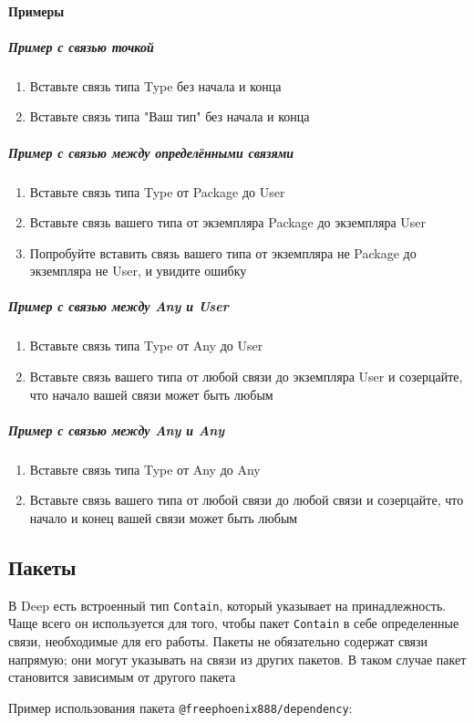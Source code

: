 \documentclass{article}
\begin{document}
\paragraph{Примеры}
\subparagraph{Пример с связью точкой}
\begin{enumerate}
  \item Вставьте связь типа Type без начала и конца
  \item Вставьте связь типа "Ваш тип" без начала и конца
\end{enumerate}
\subparagraph{Пример с связью между определёнными связями}
\begin{enumerate}
  \item Вставьте связь типа Type от Package до User
  \item Вставьте связь вашего типа от экземпляра Package до экземпляра User
  \item Попробуйте вставить связь вашего типа от экземпляра не Package до
        экземпляра не User, и увидите ошибку
\end{enumerate}
\subparagraph{Пример с связью между Any и User}
\begin{enumerate}
  \item Вставьте связь типа Type от Any до User
  \item Вставьте связь вашего типа от любой связи до экземпляра User и
        созерцайте, что начало вашей связи может быть любым
\end{enumerate}
\subparagraph{Пример с связью между Any и Any}
\begin{enumerate}
  \item Вставьте связь типа Type от Any до Any
  \item Вставьте связь вашего типа от любой связи до любой связи и
        созерцайте, что начало и конец вашей связи может быть любым
\end{enumerate}
\subsection{Пакеты}

В Deep есть встроенный тип \texttt{Contain}, который указывает на
принадлежность. Чаще всего он используется для того, чтобы пакет
\texttt{Contain} в себе определенные связи, необходимые для его работы.
Пакеты не обязательно содержат связи напрямую; они могут
                указывать на связи из других пакетов. В таком случае пакет становится зависимым от другого пакета


Пример использования пакета \texttt{@freephoenix888/dependency}:
\end{document}
